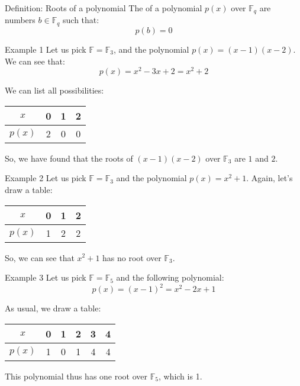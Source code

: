 \documentclass[a4paper]{article}
\begin{document}
\begin{parag}{Definition: Roots of a polynomial}
    The  of a polynomial $p\left(x\right)$ over $\mathbb{F}_q$ are numbers $b \in \mathbb{F}_q$ such that: 
    \[p\left(b\right) = 0\]
    
    \begin{subparag}{Example 1}
        Let us pick $\mathbb{F} = \mathbb{F}_3$, and the polynomial $p\left(x\right) = \left(x - 1\right)\left(x - 2\right)$. We can see that: 
        \[p\left(x\right) = x^2 - 3x + 2 = x^2 + 2\]
        
        We can list all possibilities: 
        \begin{center}
        \begin{tabular}{c|ccc}
            $x$ & 0 & 1 & 2 \\
            \hline
            $p\left(x\right)$ & 2 & 0 & 0
        \end{tabular}
        \end{center}
        
        So, we have found that the roots of $\left(x-1\right)\left(x-2\right)$ over $\mathbb{F}_3$ are $1$ and $2$.
    \end{subparag}

    \begin{subparag}{Example 2}
        Let us pick $\mathbb{F} = \mathbb{F}_3$ and the polynomial $p\left(x\right) = x^2 + 1$. Again, let's draw a table:
        \begin{center}
        \begin{tabular}{c|ccc}
            $x$ & 0 & 1 & 2 \\
            \hline
            $p\left(x\right)$ & 1 & 2 & 2
        \end{tabular}
        \end{center}
        
        So, we can see that $x^2 + 1$ has no root over $\mathbb{F}_3$.
    \end{subparag}
    
    \begin{subparag}{Example 3}
        Let us pick $\mathbb{F} = \mathbb{F}_5$ and the following polynomial: 
        \[p\left(x\right) = \left(x - 1\right)^2 = x^2  - 2x + 1\]
        
        As usual, we draw a table:
        \begin{center}
        \begin{tabular}{c|ccccc}
            $x$ & 0 & 1 & 2 & 3 & 4 \\
            \hline
            $p\left(x\right)$ & 1 & 0 & 1 & 4 & 4
        \end{tabular}
        \end{center}
        
        This polynomial thus has one root over $\mathbb{F}_5$, which is 1.
    \end{subparag}
\end{parag}
\end{document}
